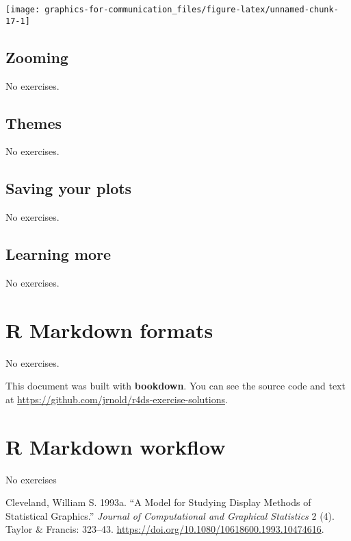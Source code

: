 \documentclass[]{book}
\theoremstyle{plain}
\theoremstyle{remark}
\begin{document}
\begin{center}\texttt{[image: graphics-for-communication\_files/figure-latex/unnamed-chunk-17-1]} \end{center}

\hypertarget{zooming}{%
\section{Zooming}\label{zooming}}

No exercises.

\hypertarget{themes}{%
\section{Themes}\label{themes}}

No exercises.

\hypertarget{saving-your-plots}{%
\section{Saving your plots}\label{saving-your-plots}}

No exercises.

\hypertarget{learning-more-2}{%
\section{Learning more}\label{learning-more-2}}

No exercises.

\hypertarget{r-markdown-formats}{%
\chapter{R Markdown formats}\label{r-markdown-formats}}

No exercises.

This document was built with \textbf{bookdown}. You can see the source
code and text at
\url{https://github.com/jrnold/r4ds-exercise-solutions}.

\hypertarget{r-markdown-workflow}{%
\chapter{R Markdown workflow}\label{r-markdown-workflow}}

No exercises

\hypertarget{refs}{}
\leavevmode\hypertarget{ref-Cleveland1993a}{}%
Cleveland, William S. 1993a. ``A Model for Studying Display Methods of
Statistical Graphics.'' \emph{Journal of Computational and Graphical
Statistics} 2 (4). Taylor \& Francis: 323--43.
\url{https://doi.org/10.1080/10618600.1993.10474616}.
\end{document}
